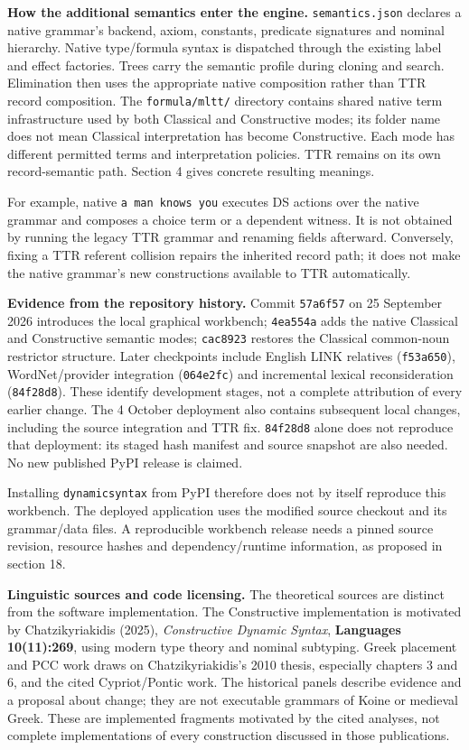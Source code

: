 \documentclass[11pt,a4paper]{article}
\begin{document}
\textbf{How the additional semantics enter the engine.}
\texttt{semantics.json} declares a native grammar's backend, axiom,
constants, predicate signatures and nominal hierarchy. Native
type/formula syntax is dispatched through the existing label and effect
factories. Trees carry the semantic profile during cloning and search.
Elimination then uses the appropriate native composition rather than TTR
record composition. The \nolinkurl{formula/mltt/} directory contains
shared native term infrastructure used by both Classical and
Constructive modes; its folder name does not mean Classical
interpretation has become Constructive. Each mode has different
permitted terms and interpretation policies. TTR remains on its own
record-semantic path. Section 4 gives concrete resulting meanings.

For example, native \texttt{a\ man\ knows\ you} executes DS actions over
the native grammar and composes a choice term or a dependent witness. It
is not obtained by running the legacy TTR grammar and renaming fields
afterward. Conversely, fixing a TTR referent collision repairs the
inherited record path; it does not make the native grammar's new
constructions available to TTR automatically.

\textbf{Evidence from the repository history.} Commit \texttt{57a6f57}
on 25 September 2026 introduces the local graphical workbench;
\texttt{4ea554a} adds the native Classical and Constructive semantic
modes; \texttt{cac8923} restores the Classical common-noun restrictor
structure. Later checkpoints include English LINK relatives
(\texttt{f53a650}), WordNet/provider integration (\texttt{064e2fc}) and
incremental lexical reconsideration (\texttt{84f28d8}). These identify
development stages, not a complete attribution of every earlier change.
The 4 October deployment also contains subsequent local changes,
including the source integration and TTR fix. \texttt{84f28d8} alone
does not reproduce that deployment: its staged hash manifest and source
snapshot are also needed. No new published PyPI release is claimed.

Installing \texttt{dynamicsyntax} from PyPI therefore does not by itself
reproduce this workbench. The deployed application uses the modified
source checkout and its grammar/data files. A reproducible workbench
release needs a pinned source revision, resource hashes and
dependency/runtime information, as proposed in section 18.

\textbf{Linguistic sources and code licensing.} The theoretical sources
are distinct from the software implementation. The Constructive
implementation is motivated by Chatzikyriakidis (2025),
\emph{Constructive Dynamic Syntax}, \textbf{Languages 10(11):269}, using
modern type theory and nominal subtyping. Greek placement and PCC work
draws on Chatzikyriakidis's 2010 thesis, especially chapters 3 and 6,
and the cited Cypriot/Pontic work. The historical panels describe
evidence and a proposal about change; they are not executable grammars
of Koine or medieval Greek. These are implemented fragments motivated by
the cited analyses, not complete implementations of every construction
discussed in those publications.
\end{document}
